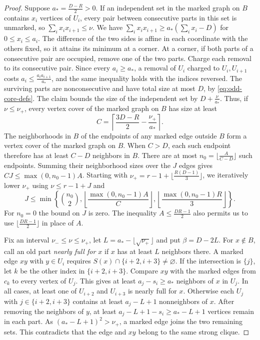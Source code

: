 \begin{proof}
Suppose $a_*=\frac{D-R}{2}>0$. If an independent set in the marked
graph on $B$ contains $x_i$ vertices of $U_i$, every pair between
consecutive parts in this set is unmarked, so $\sum_i x_ix_{i+1}\leq \nu$.
We have $\sum_i x_ix_{i+1}\geq a_*(\sum_i x_i-D)$ for
$0\leq x_i\leq a_i$. The difference of the two sides is affine in each
coordinate with the others fixed, so it attains its minimum at a corner.
At a corner, if both parts of a consecutive pair are occupied, remove
one of the two parts. Charge each removal to its consecutive pair.
Since every $a_i\geq a_*$, a removal of $U_i$ charged to $U_i,U_{i+1}$
costs $a_i\leq\frac{a_ia_{i+1}}{a_*}$, and the same inequality holds
with the indices reversed. The surviving parts are nonconsecutive
and have total size at most $D$, by \eqref{eq:odd-core-defs}.
The claim bounds the size of the independent set by $D+\frac{\nu}{a_*}$.
Thus, if $\nu\leq \nu_+$, every vertex cover of the marked graph on $B$
has size at least
\[
 C=\left\lceil \frac{3D-R}{2}-\frac{\nu_+}{a_*}\right\rceil.
\]
The neighborhoods in $B$ of the endpoints of any marked edge
outside $B$ form a vertex cover of the marked graph on $B$.
When $C>D$, each such endpoint therefore has at least $C-D$
neighbors in $B$. There are at most
$n_0=\bigl\lfloor\frac{A}{C-D}\bigr\rfloor$ such endpoints. Summing their
neighborhood sizes over the $J$ edges gives $CJ\leq\max(0,n_0-1)A$.
Starting with
$\nu_+=r-1+\lfloor \frac{R(D-1)}{3}\rfloor$, we iteratively lower $\nu_+$ using
$\nu\leq r-1+J$ and
\[
 J\leq \min\left\{\binom{n_0}{2},
       \left\lfloor\frac{\max(0,n_0-1)A}{C}\right\rfloor,
       \left\lfloor\frac{\max(0,n_0-1)R}{3}\right\rfloor\right\}.
\]
For $n_0=0$ the bound on $J$ is zero. The inequality $A\leq\frac{DR-1}{2}$ also permits us to use
$\lfloor\frac{DR-1}{2}\rfloor$ in place of $A$.

Fix an interval $\nu_-\leq \nu\leq \nu_+$, let
$L=a_*-\lfloor\sqrt{\nu_+}\rfloor$ and put $\beta=D-2L$.
For $x\notin B$, call an old part \emph{nearly full for $x$} if
$x$ has at least $L$ neighbors there. A marked edge $xy$ with $y\in U_i$
requires
$S(x)\cap\{i+2,i+3\}\ne\varnothing$. If the intersection is
$\{j\}$, let $k$ be the other index in $\{i+2,i+3\}$. Compare
$xy$ with the marked edges from $c_k$ to every vertex of $U_j$. This gives at least $a_j-s_i\geq a_*$ neighbors
of $x$ in $U_j$. In all cases, at least one of $U_{i+2}$ and $U_{i+3}$
is nearly full for $x$. Otherwise each $U_j$ with
$j\in\{i+2,i+3\}$ contains at least $a_j-L+1$ nonneighbors of $x$.
After removing the neighbors of $y$, at least $a_j-L+1-s_i\geq
a_*-L+1$ vertices remain in each part. As
$(a_*-L+1)^2>\nu_+$, a marked edge joins the two remaining sets.
This contradicts that the edge and $xy$ belong to the same strong clique.


\end{proof}
